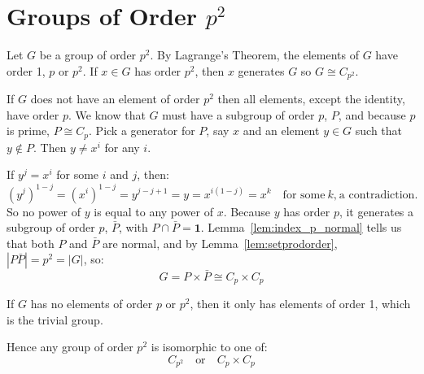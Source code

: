 \section{Groups of Order \(p^2\)}
Let \(G\) be a group of order \(p^2\).
By Lagrange's Theorem, the elements of \(G\) have order 1, \(p\) or \(p^2\).
If \(x \in G\) has order \(p^2\), then \(x\) generates \(G\) so \(G \cong C_{p^2}\).

If \(G\) does not have an element of order \(p^2\) then all elements, except the identity, have order \(p\).
We know that \(G\) must have a subgroup of order \(p\), \(P\), and because \(p\) is prime, \(P \cong C_p\).
Pick a generator for \(P\), say \(x\) and an element \(y \in G\) such that \(y \notin P\).
Then \(y \neq x^i\) for any \(i\).

If \(y^j = x^i\) for some \(i\) and \(j\), then:
\[{(y^j)}^{1-j} = {(x^i)}^{1-j} = y^{j-j+1} = y = x^{i(1-j)} = x^k \quad \text{for some} \ k\text{,} \ \text{a
contradiction.}\]
So no power of \(y\) is equal to any power of \(x\).
Because \(y\) has order \(p\), it generates a subgroup of order \(p\), \(\bar{P}\), with \(P \cap \bar{P} = \bm{1}\).
Lemma~\ref{lem:index_p_normal} tells us that both \(P\) and \(\bar{P}\) are normal, and by Lemma~\ref{lem:setprodorder},
\(|P\bar{P}| = p^2 = |G|\), so:
\[G = P \times \bar{P} \cong C_p \times C_p\]

If \(G\) has no elements of order \(p\) or \(p^2\), then it only has elements of order 1, which is the trivial group.

Hence any group of order \(p^2\) is isomorphic to one of:
\[C_{p^2} \quad \text{or} \quad C_p \times C_p\]

